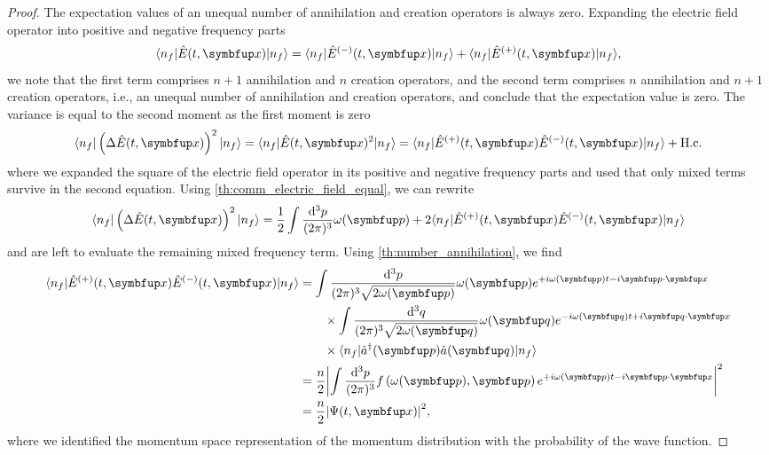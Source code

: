 \begin{proof}
	The expectation values of an unequal number of annihilation and creation operators is always zero.
	Expanding the electric field operator into positive and negative frequency parts
	\begin{equation}
		\bra{n_f}
		\hat{E}(t,\vb{x})
		\ket{n_f}
		=
		\bra{n_f}
		\hat{E}^{(-)}(t,\vb{x})
		\ket{n_f}
		+
		\bra{n_f}
		\hat{E}^{(+)}(t,\vb{x})
		\ket{n_f}
		,
	\end{equation}
	we note that the first term comprises $n+1$ annihilation and $n$ creation operators, and the second term comprises $n$ annihilation and $n+1$ creation operators, i.e., an unequal number of annihilation and creation operators, and conclude that the expectation value is zero.
	The variance is equal to the second moment as the first moment is zero
	\begin{equation}
		\bra{n_f}
		\left(
			\Delta
			\hat{E}(t,\vb{x})
		\right)^2
		\ket{n_f}
		=
		\bra{n_f}
		\hat{E}(t,\vb{x})^2
		\ket{n_f}
		=
		\bra{n_f}
		\hat{E}^{(+)}(t,\vb{x})
		\hat{E}^{(-)}(t,\vb{x})
		\ket{n_f}
		+
		\text{H.c.}
	\end{equation}
	where we expanded the square of the electric field operator in its positive and negative frequency parts and used that only mixed terms survive in the second equation.
	Using \cref{th:comm_electric_field_equal}, we can rewrite
	\begin{equation}
		\bra{n_f}
		\left(
			\Delta
			\hat{E}(t,\vb{x})
		\right)^2
		\ket{n_f}
		=
		\frac{1}{2}
		\int\frac{\dd[3]{p}}{(2\pi)^3}
		\omega(\vb{p})
		+		
		2
		\bra{n_f}
		\hat{E}^{(+)}(t,\vb{x})
		\hat{E}^{(-)}(t,\vb{x})
		\ket{n_f}
	\end{equation}
	and are left to evaluate the remaining mixed frequency term.
	Using \cref{th:number_annihilation}, we find
	\begin{equation}
		\begin{split}
			\bra{n_f}
			\hat{E}^{(+)}(t,\vb{x})
			\hat{E}^{(-)}(t,\vb{x})
			\ket{n_f}
			&=
			\int\frac{\dd[3]{p}}{(2\pi)^3\sqrt{2\omega(\vb{p})}}
			\omega(\vb{p})
			e^{+i\omega(\vb{p})t-i\vb{p}\vdot\vb{x}}
			\\
			&\qquad\times
			\int\frac{\dd[3]{q}}{(2\pi)^3\sqrt{2\omega(\vb{q})}}
			\omega(\vb{q})
			e^{-i\omega(\vb{q})t+i\vb{q}\vdot\vb{x}}
			\\
			&\qquad\times
			\bra{n_f}
			\hat{a}^\dagger(\vb{p})
			\hat{a}(\vb{q})
			\ket{n_f}
			\\
			&=
			\frac{n}{2}
			\abs*{
				\int\frac{\dd[3]{p}}{(2\pi)^3}
				f\left(\omega(\vb{p}),\vb{p}\right)
				e^{+i\omega(\vb{p})t-i\vb{p}\vdot\vb{x}}
			}^2
			\\
			&=
			\frac{n}{2}
			\abs*{\Psi(t,\vb{x})}^2
			,
		\end{split}
	\end{equation}
	where we identified the momentum space representation of the momentum distribution with the probability of the wave function.
\end{proof}
